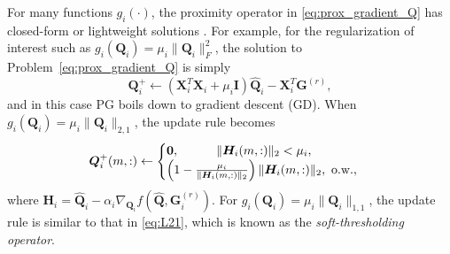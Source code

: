 \documentclass[10pt,journal]{IEEEtran}
\newcommand{\G}{\boldsymbol{G}}
\newcommand{\Q}{\boldsymbol{Q}}
\begin{document}
For many functions $g_i(\cdot)$, the proximity operator in \eqref{eq:prox_gradient_Q} has closed-form or lightweight solutions \cite{parikh2013proximal}.
For example, for the regularization of interest such as $g_i(\Q_i)=\mu_i\|\Q_i\|_{F}^2$, the solution to Problem~\eqref{eq:prox_gradient_Q} is simply
\begin{equation}\label{eq:L2}
\Q_i^{+} \leftarrow ({\bm X}_i^T{\bm X}_i+\mu_i\bm I)\hat{\bm Q}_i- {\bm X}_i^T{\bm G}^{(r)},
\end{equation} 
and in this case PG boils down to gradient descent (GD).
When $g_i(\Q_i)=\mu_i\|\Q_i\|_{2,1}$, the update rule becomes
\begin{equation}\label{eq:L21}
\Q_i^{+}(m,:) \leftarrow \begin{cases}
\bm 0, \quad \quad\quad\|\bm H_i(m,:)\|_2 < \mu_i,\\
\left(1 - \frac{\mu_i}{\|\bm H_i(m,:)\|_2}\right)\|\bm H_i(m,:)\|_2,~{\rm o.w.},
\end{cases}
\end{equation}
where $\bm H_i =\hat{\Q}_i-\alpha_i \nabla_{\Q_i} f\left(\hat{\Q},\G_i^{(r)}\right)$.
For $g_i(\Q_i)=\mu_i\|\Q_i\|_{1,1}$, the update rule is similar to that in \eqref{eq:L21},
which is known as the \emph{soft-thresholding operator}.
\end{document}
